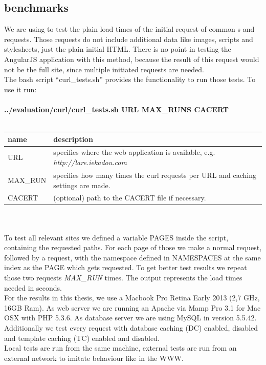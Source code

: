 \subsection{\curl{} benchmarks\label{curl}}
We are using \curl{} to test the plain load times of the initial request of common \httpRequest{}s and \lare{} requests.
Those \curl{} requests do not include additional data like images, scripts and stylesheets, just the plain initial HTML.
There is no point in testing the AngularJS application with this method, because the result of this request would not be the full site, since multiple \ajax{} initiated requests are needed.
\\
The bash script \enquote{curl\_tests.sh} provides the functionality to run those \curl{} tests.
To use it run:
\\
\\
\large{\textbf{{../evaluation/curl/curl\_tests.sh URL MAX\_RUNS CACERT}}}
\\
\\
\begin{tabular}{|p{4cm}|p{9cm}|}
    \hline
    \textbf{name} & \textbf{description} \\
    \hline
    URL & specifies where the web application is available, e.g. \emph{http://lare.iekadou.com} \\
    \hline
    MAX\_RUN & specifies how many times the curl requests per URL and caching settings are made. \\
    \hline
    CACERT & (optional) path to the CACERT file if necessary. \\
    \hline
\end{tabular}
\\
\\
\noindent{}To test all relevant sites we defined a variable PAGES inside the script, containing the requested paths.
For each page of those we make a normal request, followed by a \lare{} request, with the namespace defined in NAMESPACES at the same index as the PAGE which gets requested.
To get better test results we repeat those two requests \emph{MAX\_RUN} times. The output represents the load times needed in seconds.
\\
For the results in this thesis, we use a Macbook Pro Retina Early 2013 (2,7 GHz, 16GB Ram).
As web server we are running an Apache via Mamp Pro 3.1 for Mac OSX with PHP 5.3.6.
As database server we are using MySQL in version 5.5.42.
\\
Additionally we test every request with database caching (DC) enabled, disabled and template caching (TC) enabled and disabled.
\\
Local tests are run from the same machine, external tests are run from an external network to imitate behaviour like in the WWW.


